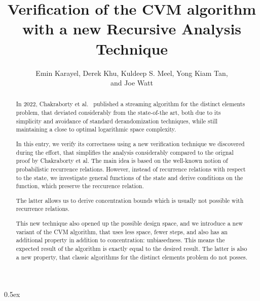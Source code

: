 \documentclass[11pt,a4paper]{article}
\begin{document}
\title{Verification of the CVM algorithm with a new Recursive Analysis Technique}
\author{Emin Karayel, Derek Khu, Kuldeep S. Meel, Yong Kiam Tan,\\and Joe Watt}
\maketitle

\begin{abstract}
In 2022, Chakraborty et al.~\cite{chakraborty22} published a streaming algorithm for the distinct
elements problem, that deviated considerably from the state-of-the art, both due to its simplicity
and avoidance of standard derandomization techniques, while still maintaining a close to optimal
logarithmic space complexity.

In this entry, we verify its correctness using a new verification technique we discovered during the
effort, that simplifies the analysis considerably compared to the orignal proof by Chakraborty et
al. The main idea is based on the well-known notion of probabilistic recurrence relations. However,
instead of recurrence relations with respect to the state, we investigate general functions of the
state and derive conditions on the function, which preserve the reccurence relation.

The latter allows us to derive concentration bounds which is usually not possible with 
recurrence relations.

This new technique also opened up the possible design space, and we introduce a new variant of the 
CVM algorithm, that uses less space, fewer steps, and also has an additional property in addition 
to concentration: unbiasedness. This means the expected result of the algorithm is exactly equal to
the desired result. The latter is also a new property, that classic algorithms for the distinct
elements problem do not posses.
\end{abstract}

\tableofcontents

\parindent 0pt\parskip 0.5ex





\end{document}
